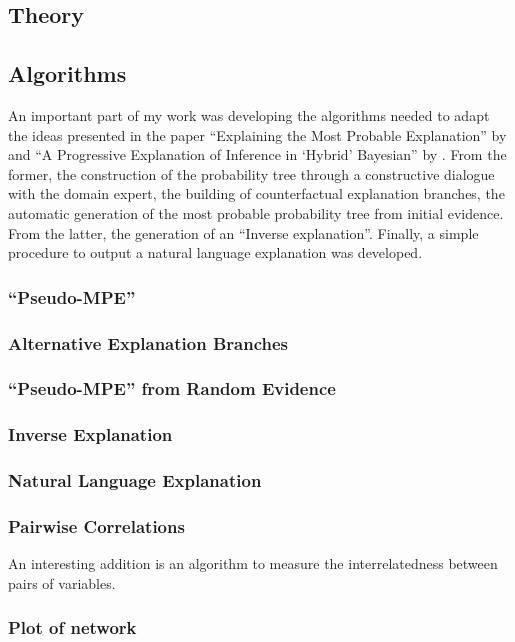 \subsection{Theory}


\subsection{Algorithms}
An important part of my work was developing the algorithms needed to adapt the ideas presented in the paper \enquote{Explaining the Most Probable Explanation} by \cite{Butz2018} and \enquote{A Progressive Explanation of Inference in \enquote{Hybrid} Bayesian} by \cite{Kyrimi2016}.
From the former, the construction of the probability tree through a constructive dialogue with the domain expert, the building of counterfactual explanation branches, the automatic generation of the most probable probability tree from initial evidence.
From the latter, the generation of an \enquote{Inverse explanation}.
Finally, a simple procedure to output a natural language explanation was developed.

\subsubsection{\enquote{Pseudo-MPE}} \label{subsubsec:pseudo-mpe}


\subsubsection{Alternative Explanation Branches}

\subsubsection{\enquote{Pseudo-MPE} from Random Evidence} \label{subsubsec: pseudo-mpe-random}

\subsubsection{Inverse Explanation}

\subsubsection{Natural Language Explanation}

\subsubsection{Pairwise Correlations}
An interesting addition is an algorithm to measure the interrelatedness between pairs of variables.

\subsubsection{Plot of network} \label{subsubsec:plot-model}

